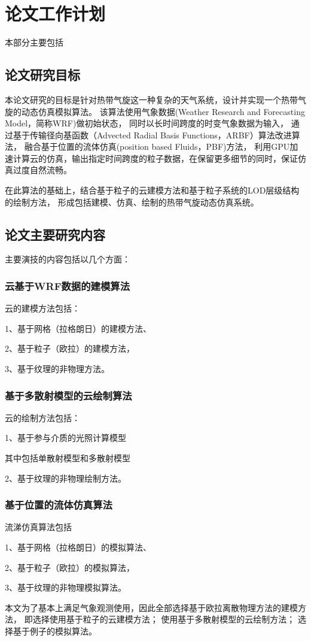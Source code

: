 
\chapter{论文工作计划}
本部分主要包括
\section{论文研究目标}

本论文研究的目标是针对热带气旋这一种复杂的天气系统，设计并实现一个热带气旋的动态仿真模拟算法。 
该算法使用气象数据(Weather Research and Forecasting Model，简称WRF)做初始状态，
同时以长时间跨度的时变气象数据为输入，
通过基于传输径向基函数（Advected Radial Basis Functions，ARBF）算法改进算法，
融合基于位置的流体仿真(position based Fluids，PBF)方法，
利用GPU加速计算云的仿真，输出指定时间跨度的粒子数据，在保留更多细节的同时，保证仿真过度自然流畅。

在此算法的基础上，结合基于粒子的云建模方法和基于粒子系统的LOD层级结构的绘制方法，
形成包括建模、仿真、绘制的热带气旋动态仿真系统。

\section{论文主要研究内容}

主要演技的内容包括以几个方面：

\subsection{云基于WRF数据的建模算法}

云的建模方法包括：

1、基于网格（拉格朗日）的建模方法、

2、基于粒子（欧拉）的建模方法，

3、基于纹理的非物理方法。

\subsection{基于多散射模型的云绘制算法}
云的绘制方法包括：

1、基于参与介质的光照计算模型

其中包括单散射模型和多散射模型

2、基于纹理的非物理绘制方法。

\subsection{基于位置的流体仿真算法}

流涕仿真算法包括

1、基于网格（拉格朗日）的模拟算法、

2、基于粒子（欧拉）的模拟算法，

3、基于纹理的非物理模拟算法。

本文为了基本上满足气象观测使用，因此全部选择基于欧拉离散物理方法的建模方法，
即选择使用基于粒子的云建模方法；
使用基于多散射模型的云绘制方法；
选择基于例子的模拟算法。


